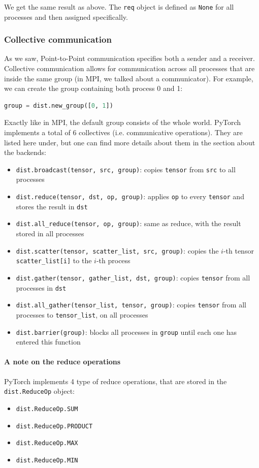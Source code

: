\documentclass{article}
\begin{document}
We get the same result as above. The \lstinline{req} object is defined as \lstinline{None} for all processes and then assigned specifically.

\subsubsection{Collective communication}
As we saw, Point-to-Point communication specifies both a sender and a receiver. Collective communication allows for communication across all processes that are inside the same group (in MPI, we talked about a communicator). For example, we can create the group containing both process 0 and 1:
\begin{lstlisting}[language=Python]
group = dist.new_group([0, 1])
\end{lstlisting}
Exactly like in MPI, the default group consists of the whole world. PyTorch implements a total of 6 collectives (i.e. communicative operations). They are listed here under, but one can find more details about them in the section about the backends:
\begin{itemize}[noitemsep]
  \item \lstinline{dist.broadcast(tensor, src, group)}: copies \lstinline{tensor} from \lstinline{src} to all processes
  \item \lstinline{dist.reduce(tensor, dst, op, group)}: applies \lstinline{op} to every \lstinline{tensor} and stores the result in \lstinline{dst}
  \item \lstinline{dist.all_reduce(tensor, op, group)}: same as reduce, with the result stored in all processes
  \item \lstinline{dist.scatter(tensor, scatter_list, src, group)}: copies the \(i\)-th tensor \lstinline{scatter_list[i]} to the \(i\)-th process
  \item \lstinline{dist.gather(tensor, gather_list, dst, group)}: copies \lstinline{tensor} from all processes in \lstinline{dst}
  \item \lstinline{dist.all_gather(tensor_list, tensor, group)}: copies \lstinline{tensor} from all processes to \lstinline{tensor_list}, on all processes
  \item \lstinline{dist.barrier(group)}: blocks all processes in \lstinline{group} until each one has entered this function
\end{itemize}

\paragraph{A note on the reduce operations}
PyTorch implements 4 type of reduce operations, that are stored in the \lstinline{dist.ReduceOp} object:
\begin{itemize}[noitemsep]
  \item \lstinline{dist.ReduceOp.SUM}
  \item \lstinline{dist.ReduceOp.PRODUCT}
  \item \lstinline{dist.ReduceOp.MAX}
  \item \lstinline{dist.ReduceOp.MIN}
\end{itemize}
\end{document}
